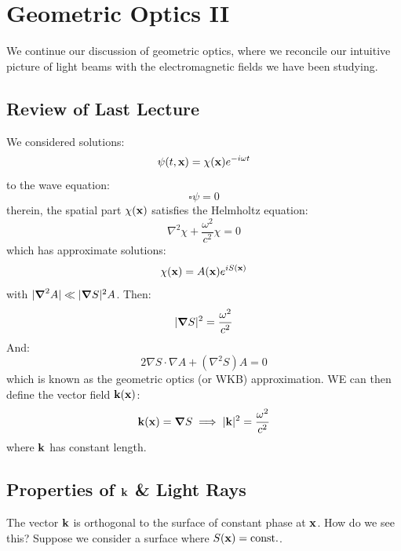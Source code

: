 \section{Geometric Optics II}
We continue our discussion of geometric optics, where we reconcile our intuitive picture of light beams with the electromagnetic fields we have been studying.

\subsection{Review of Last Lecture}
We considered solutions:
\begin{equation}
    \psi(t, \mathbf{x}) = \chi(\mathbf{x})e^{-i\omega t}
\end{equation}
to the wave equation:
\begin{equation}
    \square \psi = 0
\end{equation}
therein, the spatial part $\chi(\mathbf{x})$ satisfies the Helmholtz equation:
\begin{equation}
    \nabla^2 \chi + \frac{\omega^2}{c^2}\chi = 0
\end{equation}
which has approximate solutions:
\begin{equation}
    \chi(\mathbf{x}) = A(\mathbf{x})e^{iS(\mathbf{x})}
\end{equation}
with $\abs{\nabla^2 A} \ll \abs{\nabla S}^2 A$. Then:
\begin{equation}
    \abs{\nabla S}^2 = \frac{\omega^2}{c^2}
\end{equation}
And:
\begin{equation}
    2\nabla S \cdot \nabla A + (\nabla^2 S)A = 0
\end{equation}
which is known as the geometric optics (or WKB) approximation. WE can then define the vector field $\mathbf{k}(\mathbf{x})$:
\begin{equation}
    \v{k}(\v{x}) = \nabla S \implies \abs{\v{k}}^2 = \frac{\omega^2}{c^2}
\end{equation}
where $\mathbf{k}$ has constant length. 

\subsection{Properties of $\mathbf{k}$ \& Light Rays}
The vector $\mathbf{k}$ is orthogonal to the surface of constant phase at $\mathbf{x}$. How do we see this? Suppose we consider a surface where $S(\mathbf{x}) = \text{const.}$. 

